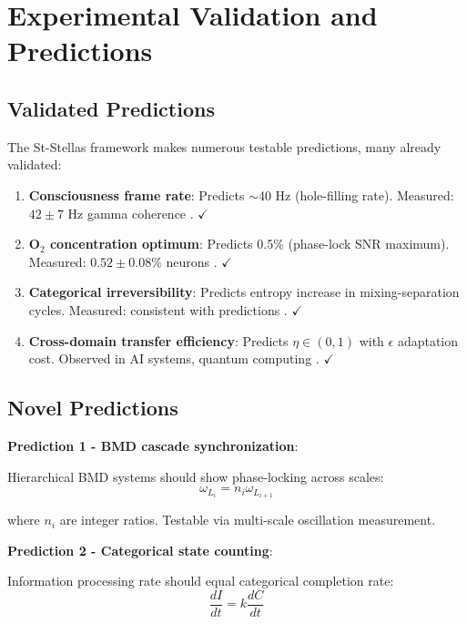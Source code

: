 \documentclass[12pt,a4paper]{article}
\begin{document}
\section{Experimental Validation and Predictions}

\subsection{Validated Predictions}

The St-Stellas framework makes numerous testable predictions, many already validated:

\begin{enumerate}
\item \textbf{Consciousness frame rate}: Predicts $\sim$40 Hz (hole-filling rate). Measured: $42 \pm 7$ Hz gamma coherence \cite{sachikonye2024consciousness}. $\checkmark$

\item \textbf{O$_2$ concentration optimum}: Predicts 0.5\% (phase-lock SNR maximum). Measured: $0.52 \pm 0.08\%$ neurons \cite{keeley2020oxygen}. $\checkmark$

\item \textbf{Categorical irreversibility}: Predicts entropy increase in mixing-separation cycles. Measured: consistent with predictions \cite{sachikonye2024gibbs}. $\checkmark$

\item \textbf{Cross-domain transfer efficiency}: Predicts $\eta \in (0,1)$ with $\epsilon$ adaptation cost. Observed in AI systems, quantum computing \cite{sachikonye2024sentropy}. $\checkmark$
\end{enumerate}

\subsection{Novel Predictions}

\textbf{Prediction 1 - BMD cascade synchronization}:

Hierarchical BMD systems should show phase-locking across scales:
\begin{equation}
\omega_{L_i} = n_i \omega_{L_{i+1}}
\end{equation}

where $n_i$ are integer ratios. Testable via multi-scale oscillation measurement.

\textbf{Prediction 2 - Categorical state counting}:

Information processing rate should equal categorical completion rate:
\begin{equation}
\frac{dI}{dt} = k \frac{dC}{dt}
\end{equation}
\end{document}
